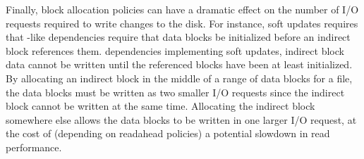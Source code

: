 Finally, block allocation policies can have a dramatic effect on the number of
I/O requests required to write changes to the disk. For instance, soft
updates requires that  -like dependencies require that data blocks be initialized before
an indirect block references them.   
dependencies implementing soft updates, indirect block data cannot be written
until the referenced blocks have been at least initialized. By allocating an
indirect block in the middle of a range of data blocks for a file, the data
blocks must be written as two smaller I/O requests since the indirect block
cannot be written at the same time. Allocating the indirect block somewhere
else allows the data blocks to be written in one larger I/O request, at the
cost of (depending on readahead policies) a potential slowdown in read performance.


\begin{comment}
Several functions in \Kudos\ iterate over lists of \patches\ looking for either
a single \patch\ or set of \patches\ satisfying some property, or trying to
process all the \patches\ in the list in some order determined by the dependency
graph. It is generally the case that the \patches\ satisfying the property or
the order in which the \patches\ should be processed can be determined very
quickly by keeping the lists sorted. For instance, the library function which
reverts \patches\ needs to perform the revert operations essentially in inverse
creation order, so that reverting a \patch\ which has since been overwritten
by a later \patch\ does the right thing. Keeping the list of all \patches\ on a
block sorted in creation order (which is very easy) makes this an efficient
operation, while it might otherwise take $O(n^2)$ time to execute. Similarly,
many \patch\ merging functions need to find for a given block some \patch\
which has no \befores\ on the same block, and the oldest \patch\ on a block
always satisfies this requirement.
\end{comment}
